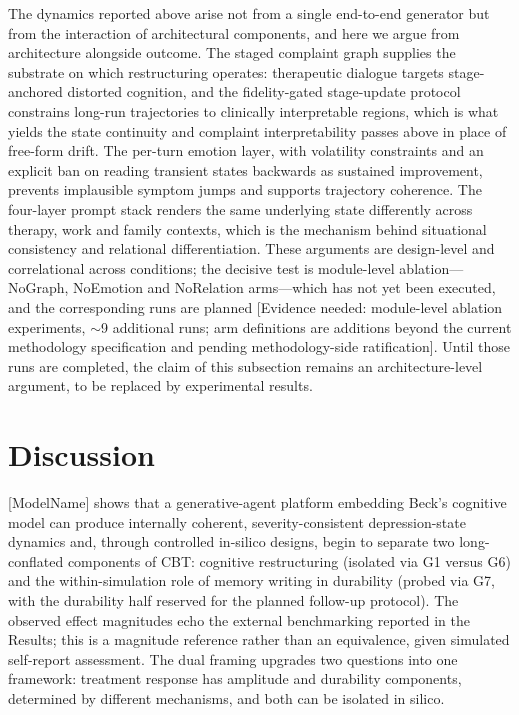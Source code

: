 \documentclass[sn-nature,pdflatex]{sn-jnl}
\begin{document}
The dynamics reported above arise not from a single end-to-end generator but from the interaction of architectural components, and here we argue from architecture alongside outcome. The staged complaint graph supplies the substrate on which restructuring operates: therapeutic dialogue targets stage-anchored distorted cognition, and the fidelity-gated stage-update protocol constrains long-run trajectories to clinically interpretable regions, which is what yields the state continuity and complaint interpretability passes above in place of free-form drift. The per-turn emotion layer, with volatility constraints and an explicit ban on reading transient states backwards as sustained improvement, prevents implausible symptom jumps and supports trajectory coherence. The four-layer prompt stack renders the same underlying state differently across therapy, work and family contexts, which is the mechanism behind situational consistency and relational differentiation. These arguments are design-level and correlational across conditions; the decisive test is module-level ablation---NoGraph, NoEmotion and NoRelation arms---which has not yet been executed, and the corresponding runs are planned [Evidence needed: module-level ablation experiments, $\sim$9 additional runs; arm definitions are additions beyond the current methodology specification and pending methodology-side ratification]. Until those runs are completed, the claim of this subsection remains an architecture-level argument, to be replaced by experimental results.

\section{Discussion}\label{sec:discussion}

[ModelName] shows that a generative-agent platform embedding Beck's cognitive model can produce internally coherent, severity-consistent depression-state dynamics and, through controlled in-silico designs, begin to separate two long-conflated components of CBT: cognitive restructuring (isolated via G1 versus G6) and the within-simulation role of memory writing in durability (probed via G7, with the durability half reserved for the planned follow-up protocol). The observed effect magnitudes echo the external benchmarking reported in the Results; this is a magnitude reference rather than an equivalence, given simulated self-report assessment. The dual framing upgrades two questions into one framework: treatment response has amplitude and durability components, determined by different mechanisms, and both can be isolated in silico.
\end{document}
